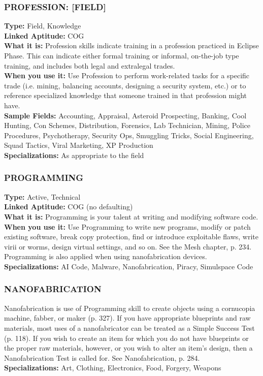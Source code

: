 \subsubsection{PROFESSION: [FIELD]}
\textbf{Type:} Field, Knowledge
\\ \textbf{Linked Aptitude:} COG
\\ \textbf{What it is:} Profession skills indicate training in a
profession practiced in Eclipse Phase. This can indicate either formal training or informal, on-the-job type
training, and includes both legal and extralegal trades.
\\ \textbf{When you use it:} Use Profession to perform work-related tasks for a specific trade (i.e. mining, balancing
accounts, designing a security system, etc.) or to reference specialized knowledge that someone trained in
that profession might have.
\\ \textbf{Sample Fields:} Accounting, Appraisal, Asteroid Prospecting, Banking, Cool Hunting, Con Schemes,
Distribution, Forensics, Lab Technician, Mining,
Police Procedures, Psychotherapy, Security Ops,
Smuggling Tricks, Social Engineering, Squad Tactics,
Viral Marketing, XP Production
\\ \textbf{Specializations:} As appropriate to the field

\subsubsection{PROGRAMMING}
\textbf{Type:} Active, Technical
\\ \textbf{Linked Aptitude:} COG (no defaulting)
\\ \textbf{What it is:} Programming is your talent at writing
and modifying software code.
\\ \textbf{When you use it:} Use Programming to write new
programs, modify or patch existing software, break
copy protection, find or introduce exploitable flaws,
write virii or worms, design virtual settings, and so
on. See the Mesh chapter, p. 234. Programming is also
applied when using nanofabrication devices.
\\ \textbf{Specializations:} AI Code, Malware, Nanofabrication,
Piracy, Simulspace Code

\subsubsection{NANOFABRICATION}
Nanofabrication is use of Programming skill to create
objects using a cornucopia machine, fabber, or maker
(p. 327). If you have appropriate blueprints and raw
materials, most uses of a nanofabricator can be treated
as a Simple Success Test (p. 118). If you wish to create
an item for which you do not have blueprints or the
proper raw materials, however, or you wish to alter an
item’s design, then a Nanofabrication Test is called for.
See Nanofabrication, p. 284.
\\ \textbf{Specializations:} Art, Clothing, Electronics, Food, Forgery, Weapons

